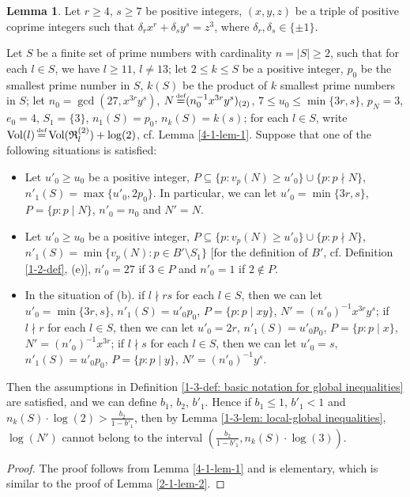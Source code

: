 \documentclass[a4paper, 12pt]{article}
\DeclareMathOperator{\defeq}{\overset{\text{\tiny{def}}}{=}}
\DeclareMathOperator{\Vol}{\text{Vol}}
\numberwithin{equation}{section}
\theoremstyle{definition}
\newtheorem{lem}[thm]{Lemma}
\begin{document}
\begin{lem}  \label{4-1-lem-3}
Let $r \ge 4$, $s\ge 7$ be positive integers, $(x,y,z)$ be a triple of positive coprime integers such that $\delta_r x^r + \delta_s y^s = z^3$, where $\delta_r,\delta_s \in \{\pm 1\}$. 

Let $S$ be a finite set of prime numbers with cardinality $n = |S| \ge 2$, such that for each $l\in S$, we have $l \ge 11$, $l\neq 13$;
let $2\le k\le S$ be a positive integer, $p_0$ be the smallest prime number in $S$, $k(S)$ be the product of $k$ smallest prime numbers in $S$;
let $n_0 = \gcd(27, x^{3r} y^s)$, $N \defeq (n_0^{-1} x^{3r} y^s)_{(2)}$, $7 \le u_0 \le \min\{3r, s\}$, $p_N = 3$, $e_0 = 4$, $S_1 = \{3\}$, $n_1(S) = p_0$, $n_k(S) = k(s)$;
for each $l\in S$, write $\Vol(l)\defeq \Vol(\mathfrak R_l^{(2)}) + \log(2)$, cf. Lemma \ref{4-1-lem-1}.
Suppose that one of the following situations is satisfied:

\begin{itemize}
\item [(a)] Let $u'_0 \ge u_0$ be a positive integer, $P\subseteq \{p: v_p(N) \ge u'_0 \} \cup \{p: p\nmid N\}$, $n'_1(S) = \max\{u'_0, 2p_0\}$.
In particular, we can let $u'_0 = \min\{3r, s\}$, $P = \{p: p\mid N\}$, $n'_0 = n_0$ and $N' = N$.

\item [(b)] Let $u'_0 \ge u_0$ be a positive integer, $P\subseteq \{p: v_p(N) \ge u'_0 \} \cup \{p: p\nmid N\}$, $n'_1(S) = \min\{v_p(N): p\in B'\setminus S_1\}$ [for the definition of $B'$, cf. Definition \ref{1-2-def}, (e)], $n'_0 = 27$ if $3\in P$ and $n'_0 = 1$ if $2\notin P$.

\item [(c)] In the situation of (b).
if $l\nmid rs$ for each $l\in S$, then we can let $u'_0 = \min\{3r, s\}$, $n'_1(S) = u'_0 p_0$, $P=\{p: p\mid xy\}$, $N' = (n'_0)^{-1} x^{3r} y^{s}$;
if $l\nmid r$ for each $l\in S$, then we can let $u'_0 = 2r$, $n'_1(S) = u'_0 p_0$, $P=\{p: p\mid x\}$, $N' = (n'_0)^{-1} x^{3r}$;
if $l\nmid s$ for each $l\in S$, then we can let $u'_0 = s$, $n'_1(S) = u'_0 p_0$, $P=\{p: p\mid y\}$, $N' = (n'_0)^{-1} y^{s}$.
\end{itemize}

Then the assumptions in Definition \ref{1-3-def: basic notation for global inequalities} are satisfied, and we can define $b_1$, $b_2$, $b'_1$. 
Hence if $b_1 \le  1$, $b'_1 < 1$ and $n_k(S)\cdot \log(2) > \frac{b_2}{1-b'_1}$, then by Lemma \ref{1-3-lem: local-global inequalities}, $\log(N')$ cannot belong to the interval $(\frac{b_2}{1-b'_1}, n_k(S)\cdot \log(3) ) .$
\end{lem}
\begin{proof}
The proof follows from Lemma \ref{4-1-lem-1} and is elementary, which is similar to the proof of Lemma \ref{2-1-lem-2}.
\end{proof}
\end{document}
